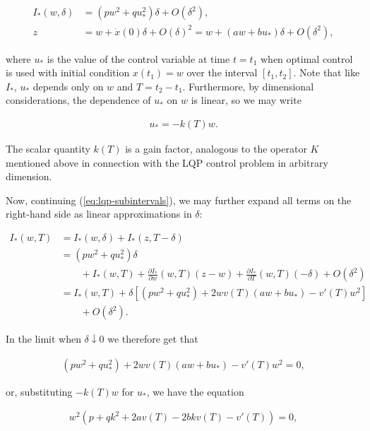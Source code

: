 \documentclass[11pt]{report}
\theoremstyle{plain}
\theoremstyle{definition}
\begin{document}
\begin{equation*} \tag{49}\label{eq:lqp-approx}
\begin{split}
I_*(w,\delta) &= (p w^2 + q u_*^2)\delta + O(\delta^2), \\
z &= w + \dot{x}(0)\delta + O(\delta)^2 = w + (aw+b u_*)\delta + O(\delta^2),
\end{split}
\end{equation*}

where $u_*$ is the value of the control variable at
time $t=t_1$ when optimal control is used with
initial condition $x(t_1)=w$ over the interval
$[t_1,t_2]$. Note that like $I_*$, $u_*$ depends only
on $w$ and $T=t_2-t_1$. Furthermore, by dimensional
considerations, the dependence of $u_*$ on $w$ is
linear, so we may write

\begin{align*}
u_* = - k(T)w.
\end{align*}

The scalar quantity $k(T)$ is a gain factor,
analogous to the operator $K$ mentioned above in
connection with the LQP control problem in arbitrary
dimension.

Now, continuing (\ref{eq:lqp-subintervals}), we may
further expand all terms on the right-hand side as
linear approximations in $\delta$:

\begin{align*}
I_*(w,T) &= I_*(w,\delta) + I_*(z,T-\delta) \\
&= (p w^2 + q u_*^2)\delta \\ & \qquad +
I_*(w,T) + \frac{\partial I_*}{\partial w}(w,T)(z-w) + \frac{\partial I_*}{\partial T}(w,T)(-\delta) + O(\delta^2) \\
&=
I_*(w,T) + \delta\left[
(p w^2+qu_*^2) + 2w v(T)(aw+b u_*) - v'(T) w^2
\right] \\
& \qquad + O(\delta^2).
\end{align*}

In the limit when $\delta\downarrow 0$ we therefore
get that

\begin{align*}
(p w^2+qu_*^2) + 2w v(T)(aw+b u_*) - v'(T) w^2 = 0,
\end{align*}

or, substituting $-k(T)w$ for $u_*$, we have the
equation

\begin{align*}
w^2\left(
p + q k^2 + 2av(T) -2 b k v(T) -v'(T)
\right) = 0,
\end{align*}
\end{document}
